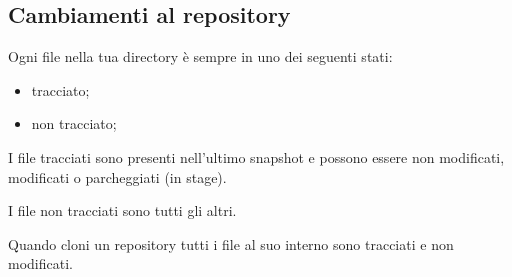 \subsection{Cambiamenti al repository}
Ogni file nella tua directory è sempre in uno dei seguenti stati:

\begin{itemize}
\item tracciato;
\item non tracciato;
\end{itemize}

I file tracciati sono presenti nell'ultimo snapshot e possono essere non modificati, modificati o parcheggiati (in stage).

I file non tracciati sono tutti gli altri.

Quando cloni un repository tutti i file al suo interno sono tracciati e non modificati.
